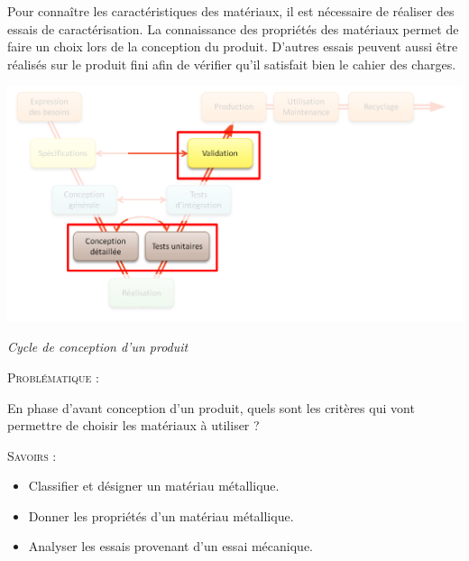 \documentclass[11pt,oneside]{article}
\begin{document}
\vspace{.5cm}

Pour connaître les caractéristiques des matériaux, il est nécessaire de réaliser des essais de caractérisation. La connaissance des propriétés des matériaux permet de faire un choix lors de la conception du produit. D'autres essais peuvent aussi être réalisés sur le produit fini afin de vérifier qu'il satisfait bien le cahier des charges.

\begin{center}
\includegraphics[width=.9\textwidth]{png/cyclev.png}

\textit{Cycle de conception d'un produit}
\end{center}

\begin{prob}
\textsc{Problématique :}

En phase d'avant conception d'un produit, quels sont les critères qui vont permettre de choisir les matériaux à utiliser ?
\end{prob}

\begin{savoir}
\textsc{Savoirs :}
\begin{itemize}
\item Classifier et désigner un matériau métallique.
\item Donner les propriétés d'un matériau métallique.
\item Analyser les essais provenant d'un essai mécanique. 
\end{itemize}
\end{savoir}


\setlength{\parskip}{0ex plus 0.2ex minus 0ex}
 \renewcommand{\contentsname}{}
 \renewcommand{\baselinestretch}{1}

\tableofcontents

 \renewcommand{\baselinestretch}{1.2}
\setlength{\parskip}{2ex plus 0.5ex minus 0.2ex}
\end{document}
